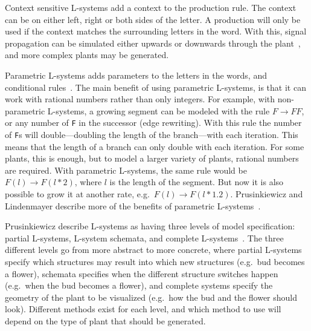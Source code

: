 
Context sensitive \glspl{L-system} add a context to the production rule.
The context can be on either left, right or both sides of the letter.
A production will only be used if the context matches the surrounding letters in the word.
With this, signal propagation can be simulated either upwards or downwards through the plant~\cite{2012Prusinkiewicz}, and more complex plants may be generated.

Parametric \glspl{L-system} adds parameters to the letters in the words, and conditional rules~\cite{2012Prusinkiewicz}.
The main benefit of using parametric \glspl{L-system}, is that it can work with rational numbers rather than only integers.
For example, with non-parametric \glspl{L-system}, a growing segment can be modeled with the rule $F\rightarrow FF$, or any number of \texttt{F} in the successor (edge rewriting).
With this rule the number of \texttt{F}s will double---doubling the length of the branch---with each iteration.
This means that the length of a branch can only double with each iteration.
For some plants, this is enough, but to model a larger variety of plants, rational numbers are required.
With parametric \glspl{L-system}, the same rule would be $F(l)\rightarrow F(l*2)$, where $l$ is the length of the segment.
But now it is also possible to grow it at another rate, e.g.\ $F(l)\rightarrow F(l*1.2)$.
Prusinkiewicz and Lindenmayer describe more of the benefits of parametric \glspl{L-system}~\cite{2012Prusinkiewicz}.

Prusinkiewicz describe \glspl{L-system} as having three levels of model specification: partial \glspl{L-system}, \gls{L-system} schemata, and complete \glspl{L-system}~\cite{2012Prusinkiewicz}.
The three different levels go from more abstract to more concrete, where partial \glspl{L-system} specify which structures may result into which new structures (e.g.\ bud becomes a flower), schemata specifies when the different structure switches happen (e.g.\ when the bud becomes a flower), and complete systems specify the geometry of the plant to be visualized (e.g.\ how the bud and the flower should look).
Different methods exist for each level, and which method to use will depend on the type of plant that should be generated.

